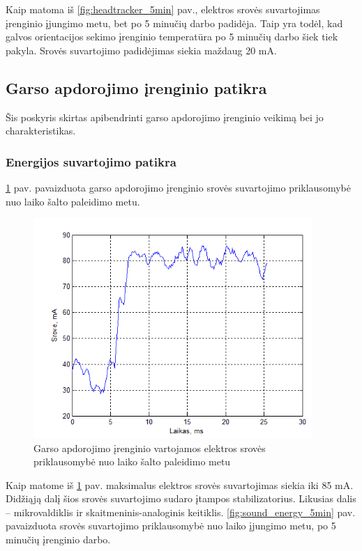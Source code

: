 \documentclass[]{vgtuef}
\begin{document}
{Kaip matoma iš \ref{fig:headtracker_5min} pav., elektros srovės suvartojimas įrenginio įjungimo metu, bet po 5 minučių darbo padidėja. Taip yra todėl, kad galvos orientacijos sekimo įrenginio temperatūra po 5 minučių darbo šiek tiek pakyla. Srovės suvartojimo padidėjimas siekia maždaug 20 mA.

\subsection{Garso apdorojimo įrenginio patikra}

Šis poskyris skirtas apibendrinti garso apdorojimo įrenginio veikimą bei jo charakteristikas.

\subsubsection{Energijos suvartojimo patikra}

\ref{fig:sound_energy} pav. pavaizduota garso apdorojimo įrenginio srovės suvartojimo priklausomybė nuo laiko šalto paleidimo metu.

\begin{figure}[htbp]
  \centering
  \includegraphics[width=400px]{img/sound_energy.png}
  \caption{Garso apdorojimo įrenginio vartojamos elektros srovės priklausomybė nuo laiko šalto paleidimo metu}
  \label{fig:sound_energy}
\end{figure}

Kaip matome iš \ref{fig:sound_energy} pav. maksimalus elektros srovės suvartojimas siekia iki 85 mA. Didžiąją dalį šios srovės suvartojimo sudaro įtampos stabilizatorius. Likusias dalis – mikrovaldiklis ir skaitmeninis-analoginis keitiklis. \ref{fig:sound_energy_5min} pav. pavaizduota srovės suvartojimo priklausomybė nuo laiko įjungimo metu, po 5 minučių įrenginio darbo.

}
\end{document}
